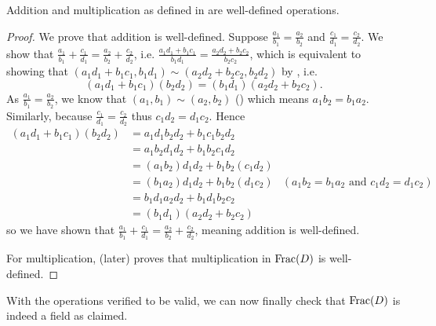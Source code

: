 \begin{proposition}
    Addition and multiplication as defined in  are well-defined operations.
\end{proposition}
\begin{proof}
    We prove that addition is well-defined. Suppose $\frac{a_1}{b_1} = \frac{a_2}{b_2}$ and $\frac{c_1}{d_1} = \frac{c_2}{d_2}$. We show that $\frac{a_1}{b_1} + \frac{c_1}{d_1} = \frac{a_2}{b_2} + \frac{c_2}{d_2}$, i.e. $\frac{a_1d_1+b_1c_1}{b_1d_1} = \frac{a_2d_2 + b_2c_2}{b_2c_2}$, which is equivalent to showing that $(a_1d_1+b_1c_1, b_1d_1) \mathrel{\sim} (a_2d_2+b_2c_2, b_2d_2)$ by , i.e.
    \[
        (a_1d_1+b_1c_1)(b_2d_2) = (b_1d_1)(a_2d_2+b_2c_2).
    \]
    As $\frac{a_1}{b_1} = \frac{a_2}{b_2}$, we know that $(a_1, b_1) \mathrel{\sim} (a_2, b_2)$ () which means $a_1b_2 = b_1a_2$. Similarly, because $\frac{c_1}{d_1} = \frac{c_2}{d_2}$ thus $c_1d_2 = d_1c_2$. Hence
    \begin{align*}
        (a_1d_1+b_1c_1)(b_2d_2) &= a_1d_1b_2d_2 + b_1c_1b_2d_2\\
        &= a_1b_2d_1d_2 + b_1b_2c_1d_2\\
        &= (a_1b_2)d_1d_2 + b_1b_2(c_1d_2)\\
        &= (b_1a_2)d_1d_2 + b_1b_2(d_1c_2) & (a_1b_2 = b_1a_2 \text{ and } c_1d_2 = d_1c_2)\\
        &= b_1d_1a_2d_2 + b_1d_1b_2c_2\\
        &= (b_1d_1)(a_2d_2 + b_2c_2)
    \end{align*}
    so we have shown that $\frac{a_1}{b_1} + \frac{c_1}{d_1} = \frac{a_2}{b_2} + \frac{c_2}{d_2}$, meaning addition is well-defined.

    For multiplication,  (later) proves that multiplication in $\mathrm{Frac}(D)$ is well-defined.
\end{proof}

With the operations verified to be valid, we can now finally check that $\mathrm{Frac}(D)$ is indeed a field as claimed.

